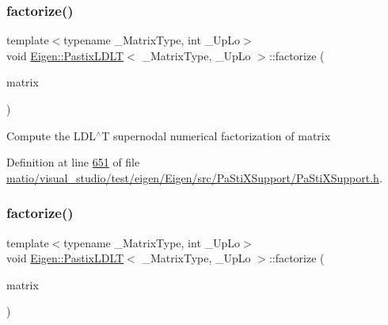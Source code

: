 \mbox{\label{class_eigen_1_1_pastix_l_d_l_t_a182b0ee676a131413363cc73bc309ef7}} 
\subsubsection{\texorpdfstring{factorize()}{factorize()}\hspace{0.1cm}{\footnotesize\ttfamily [1/2]}}
{\footnotesize\ttfamily template$<$typename \+\_\+\+Matrix\+Type, int \+\_\+\+Up\+Lo$>$ \\
void \hyperlink{class_eigen_1_1_pastix_l_d_l_t}{Eigen\+::\+Pastix\+L\+D\+LT}$<$ \+\_\+\+Matrix\+Type, \+\_\+\+Up\+Lo $>$\+::factorize (\begin{DoxyParamCaption}\item[{const Matrix\+Type \&}]{matrix }\end{DoxyParamCaption})\hspace{0.3cm}{\ttfamily [inline]}}

Compute the L\+D\+L$^\wedge$T supernodal numerical factorization of {\ttfamily matrix} 

Definition at line \hyperlink{matio_2visual__studio_2test_2eigen_2_eigen_2src_2_pa_sti_x_support_2_pa_sti_x_support_8h_source_l00651}{651} of file \hyperlink{matio_2visual__studio_2test_2eigen_2_eigen_2src_2_pa_sti_x_support_2_pa_sti_x_support_8h_source}{matio/visual\+\_\+studio/test/eigen/\+Eigen/src/\+Pa\+Sti\+X\+Support/\+Pa\+Sti\+X\+Support.\+h}.

\mbox{\label{class_eigen_1_1_pastix_l_d_l_t_a182b0ee676a131413363cc73bc309ef7}} 
\subsubsection{\texorpdfstring{factorize()}{factorize()}\hspace{0.1cm}{\footnotesize\ttfamily [2/2]}}
{\footnotesize\ttfamily template$<$typename \+\_\+\+Matrix\+Type, int \+\_\+\+Up\+Lo$>$ \\
void \hyperlink{class_eigen_1_1_pastix_l_d_l_t}{Eigen\+::\+Pastix\+L\+D\+LT}$<$ \+\_\+\+Matrix\+Type, \+\_\+\+Up\+Lo $>$\+::factorize (\begin{DoxyParamCaption}\item[{const Matrix\+Type \&}]{matrix }\end{DoxyParamCaption})\hspace{0.3cm}{\ttfamily [inline]}}

